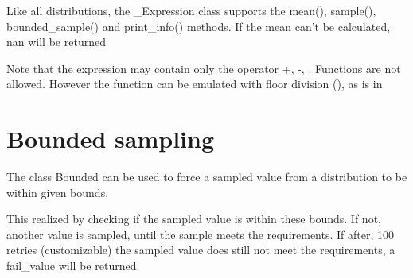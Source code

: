 \documentclass[letterpaper,10pt,english]{sphinxmanual}
\begin{document}
Like all distributions, the \_Expression class supports the
mean(), sample(), bounded\_sample() and print\_info() methods.
If the mean can’t be calculated, nan will be returned

%
\begin{sphinxVerbatim}[commandchars=\\\{\}]
     
     
      
\end{sphinxVerbatim}

Note that the expression may contain only the operator +, -, .
Functions are not allowed. However the  function can be emulated with floor division (\sphinxcode{\sphinxupquote{\textbackslash{}\textbackslash{}}}), as is in

%
\begin{sphinxVerbatim}[commandchars=\\\{\}]
       
\end{sphinxVerbatim}


\section{Bounded sampling}
\label{\detokenize{Distributions:bounded-sampling}}
The class Bounded can be used to force a sampled value from a distribution to be within given bounds.

This realized by checking if the sampled value is within these bounds. If not, another value is sampled,
until the sample meets the requirements. If after, 100 retries (customizable) the sampled value does
still not meet the requirements, a fail\_value will be returned.
\end{document}
